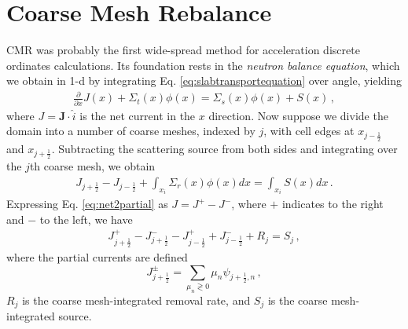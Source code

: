 \section*{Coarse Mesh Rebalance}

CMR was probably the first wide-spread method for acceleration discrete ordinates calculations.  Its foundation rests in the \textit{neutron balance equation}, which we obtain in 1-d by integrating Eq. \ref{eq:slabtransportequation} over angle, yielding
\begin{equation}
\begin{split}
 \frac{\partial }{\partial x}J(x) + \Sigma_t(x) \phi(x) = \Sigma_{s}(x)\phi(x) + S(x) \, ,
\end{split}
\label{eq:balance}
\end{equation}
where $J = \mathbf{J}\cdot \hat{i}$ is the net current in the $x$ direction. Now suppose we divide the domain into a number of coarse meshes, indexed by $j$, with cell edges at $x_{j-\frac{1}{2}}$ and $x_{j+\frac{1}{2}}$.  Subtracting the scattering source from both sides and integrating over the $j$th coarse mesh, we obtain
\begin{equation}
\begin{split}
 J_{j+\frac{1}{2}} - J_{j-\frac{1}{2}}  + \int_{x_i} \Sigma_r(x) \phi(x) dx = \int_{x_i} S(x) dx \, .
\end{split}
\end{equation}
Expressing Eq. \ref{eq:net2partial} as $J = J^+ - J^-$, where $+$ indicates to the right and $-$ to the left, we have
\begin{equation}
\begin{split}
 J^+_{j+\frac{1}{2}}- J^-_{j+\frac{1}{2}} - J^+_{j-\frac{1}{2}} + J^-_{j-\frac{1}{2}} + R_j = S_j \, ,
\end{split}
\label{eq:cmrbalance}
\end{equation}
where the partial currents are defined
\begin{equation}
 J^{\pm}_{j+\frac{1}{2}} = \sum_{\mu_n \gtrless 0} \mu_n \psi_{j+\frac{1}{2},n} \, ,
\end{equation}
$R_j$ is the coarse mesh-integrated removal rate, and $S_j$ is the coarse mesh-integrated source.  

